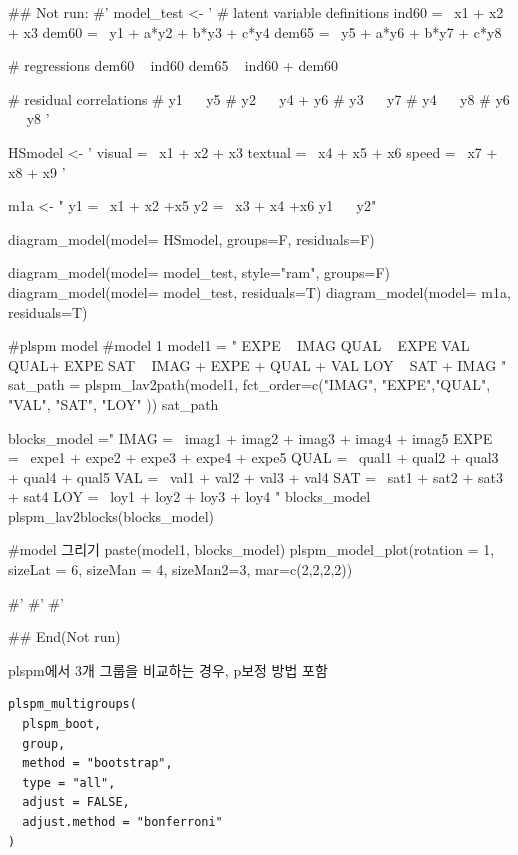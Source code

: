 \documentclass[a4paper]{book}
\begin{document}
\begin{Examples}
\begin{ExampleCode}
## Not run: 
#'
model_test <- '
  # latent variable definitions
     ind60 =~ x1 + x2 + x3
     dem60 =~ y1 + a*y2 + b*y3 + c*y4
     dem65 =~ y5 + a*y6 + b*y7 + c*y8

  # regressions
    dem60 ~ ind60
    dem65 ~ ind60 + dem60

  # residual correlations
    # y1 ~~ y5
    # y2 ~~ y4 + y6
    # y3 ~~ y7
    # y4 ~~ y8
    # y6 ~~ y8
'

HSmodel <- ' visual  =~ x1 + x2 + x3
             textual =~ x4 + x5 + x6
             speed   =~ x7 + x8 + x9 '


m1a <- "
y1 =~ x1 + x2 +x5
y2 =~ x3 + x4 +x6
y1 ~~ y2"

diagram_model(model= HSmodel, groups=F,  residuals=F)

diagram_model(model= model_test, style="ram", groups=F)
diagram_model(model= model_test, residuals=T)
diagram_model(model= m1a, residuals=T)


#plspm model
#model 1
model1 = "
EXPE ~ IMAG
QUAL ~ EXPE
VAL ~  QUAL+ EXPE
SAT ~ IMAG + EXPE + QUAL + VAL
LOY ~ SAT + IMAG
"
sat_path = plspm_lav2path(model1,
                          fct_order=c("IMAG", "EXPE","QUAL", "VAL", "SAT", "LOY" ))
sat_path

blocks_model ="
IMAG =~ imag1 + imag2 + imag3 + imag4 + imag5
EXPE =~ expe1 + expe2 + expe3 + expe4 + expe5
QUAL =~ qual1 + qual2 + qual3 + qual4 + qual5
VAL =~ val1 + val2 + val3 + val4
SAT =~ sat1 + sat2 + sat3 + sat4
LOY =~ loy1 + loy2 + loy3 + loy4
"
blocks_model
plspm_lav2blocks(blocks_model)

#model 그리기
paste(model1, blocks_model)%
  plspm_model_plot(rotation = 1, sizeLat = 6, sizeMan = 4, sizeMan2=3,
                mar=c(2,2,2,2))

#'
#'
#'

## End(Not run)

\end{ExampleCode}
\end{Examples}
%
\begin{Description}
plspm에서 3개 그룹을 비교하는 경우, p보정 방법 포함
\end{Description}
%
\begin{Usage}
\begin{verbatim}
plspm_multigroups(
  plspm_boot,
  group,
  method = "bootstrap",
  type = "all",
  adjust = FALSE,
  adjust.method = "bonferroni"
)
\end{verbatim}
\end{Usage}
\end{document}
